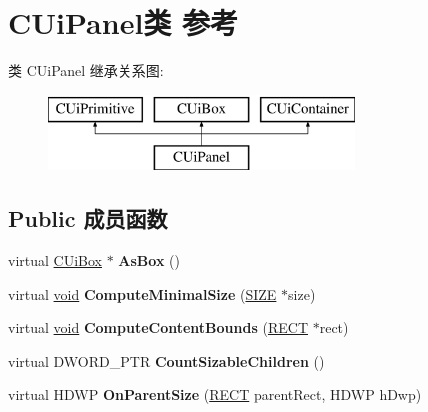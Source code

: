 \hypertarget{class_c_ui_panel}{}\section{C\+Ui\+Panel类 参考}
\label{class_c_ui_panel}
类 C\+Ui\+Panel 继承关系图\+:\begin{figure}[H]
\begin{center}
\leavevmode
\includegraphics[height=2.000000cm]{class_c_ui_panel}
\end{center}
\end{figure}
\subsection*{Public 成员函数}
\begin{DoxyCompactItemize}
\item 
\mbox{\label{class_c_ui_panel_a65c2f562290ed85ecca399bad91e79a7}} 
virtual \hyperlink{class_c_ui_box}{C\+Ui\+Box} $\ast$ {\bfseries As\+Box} ()
\item 
\mbox{\label{class_c_ui_panel_a9430ebf68bf955f04f57a9cf203c8460}} 
virtual \hyperlink{interfacevoid}{void} {\bfseries Compute\+Minimal\+Size} (\hyperlink{structtag_s_i_z_e}{S\+I\+ZE} $\ast$size)
\item 
\mbox{\label{class_c_ui_panel_a074506608ff6b1878032b76c9fa056ee}} 
virtual \hyperlink{interfacevoid}{void} {\bfseries Compute\+Content\+Bounds} (\hyperlink{structtag_r_e_c_t}{R\+E\+CT} $\ast$rect)
\item 
\mbox{\label{class_c_ui_panel_a24095f8a613a8c7fa7fc3a91196ad8ed}} 
virtual D\+W\+O\+R\+D\+\_\+\+P\+TR {\bfseries Count\+Sizable\+Children} ()
\item 
\mbox{\label{class_c_ui_panel_ad5bdfcb843a09df7c081b72d2c5219ef}} 
virtual H\+D\+WP {\bfseries On\+Parent\+Size} (\hyperlink{structtag_r_e_c_t}{R\+E\+CT} parent\+Rect, H\+D\+WP h\+Dwp)
\end{DoxyCompactItemize}

